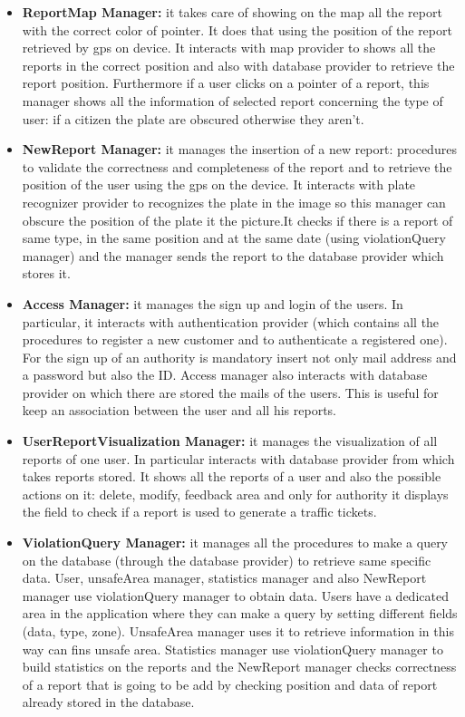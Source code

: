 \documentclass[../RASD.tex]{subfiles}
\begin{document}
    \begin{itemize}
        \item \textbf{ReportMap Manager:} it takes care of showing on the map all the report with the correct color of pointer. It does that using the position of the report retrieved by gps on device. It interacts with map provider to shows all the reports in the correct position and also with database provider to retrieve the report position. Furthermore if a user clicks on a pointer of a report, this manager shows all the information of selected report concerning the type of user: if a citizen the plate are obscured otherwise they aren’t.
        \item \textbf{NewReport Manager:} it manages the insertion of a new report: procedures to validate the correctness and completeness of the report and to retrieve the position of the user using the gps on the device. It interacts with plate recognizer provider to recognizes the plate in the image so this manager can obscure the position of the plate it the picture.It checks if there is a report of same type, in the same position and at the same date (using violationQuery manager) and the manager sends the report to the database  provider which stores it.
        \item \textbf{Access Manager:} it manages the sign up and login of the users. In particular, it interacts with authentication provider (which contains all the procedures to register a new customer and to authenticate a registered one). For the sign up of an authority is mandatory insert not only mail address and a password but also the ID. Access manager also interacts with database provider on which there are stored the mails of the users. This is useful for keep an association between the user and all his reports.
        \item \textbf{UserReportVisualization Manager:} it manages the visualization of all reports of one user. In particular interacts with database provider from which takes reports stored. It shows all the reports of a user and also the possible actions on it: delete, modify, feedback area and only for authority it displays the field to check if a report is used to generate a traffic tickets.
        \item \textbf{ViolationQuery Manager:} it manages all the procedures to make a query on the database (through the database provider) to retrieve same specific data. User, unsafeArea manager, statistics manager and also NewReport manager use violationQuery manager to obtain data. Users have a dedicated area in the application where they can make a query by setting different fields (data, type, zone). UnsafeArea manager uses it to retrieve information in this way can fins unsafe area. Statistics manager use violationQuery manager to build statistics on the reports and the NewReport manager checks correctness of a report that is going to be add by checking position and data of report already stored in the database.

\end{itemize}
\end{document}
